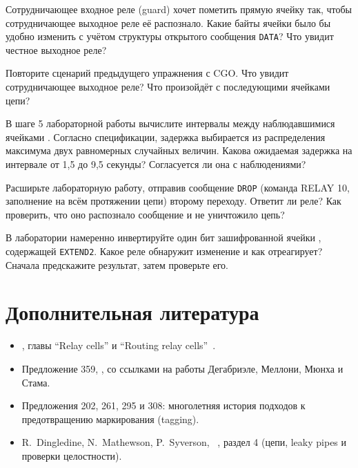 \begin{esercizio}[2]\label{es:10-tag}
Сотрудничающее входное реле (guard) хочет пометить прямую ячейку так, чтобы сотрудничающее выходное реле её распознало. Какие байты ячейки было бы удобно изменить с учётом структуры открытого сообщения \texttt{DATA}? Что увидит честное выходное реле?
\end{esercizio}

\begin{esercizio}[2]\label{es:10-cgo-tag}
Повторите сценарий предыдущего упражнения с CGO. Что увидит сотрудничающее выходное реле? Что произойдёт с последующими ячейками цепи?
\end{esercizio}

\begin{esercizio}[2]\label{es:10-padding}
В шаге 5 лабораторной работы вычислите интервалы между наблюдавшимися ячейками . Согласно спецификации, задержка выбирается из распределения максимума двух равномерных случайных величин. Какова ожидаемая задержка на интервале от 1,5 до 9,5 секунды? Согласуется ли она с наблюдениями?
\end{esercizio}

\begin{esercizio}[3]\label{es:10-drop}
Расширьте лабораторную работу, отправив сообщение \texttt{DROP} (команда RELAY 10, заполнение на всём протяжении цепи) второму переходу. Ответит ли реле? Как проверить, что оно распознало сообщение и не уничтожило цепь?
\end{esercizio}

\begin{esercizio}[3]\label{es:10-alterazione}
В лаборатории намеренно инвертируйте один бит зашифрованной ячейки , содержащей \texttt{EXTEND2}. Какое реле обнаружит изменение и как отреагирует? Сначала предскажите результат, затем проверьте его.
\end{esercizio}

\section*{Дополнительная литература}
\begin{itemize}
  \item {}, главы \enquote{Relay cells} и \enquote{Routing relay cells}~\cite{torspec}.
  \item Предложение 359, , со ссылками на работы Дегабриэле, Меллони, Мюнха и Стама.
  \item Предложения 202, 261, 295 и 308: многолетняя история подходов к предотвращению маркирования (tagging).
  \item R.~Dingledine, N.~Mathewson, P.~Syverson, ~\cite{dingledine2004tor}, раздел 4 (цепи, leaky pipes и проверки целостности).
\end{itemize}
